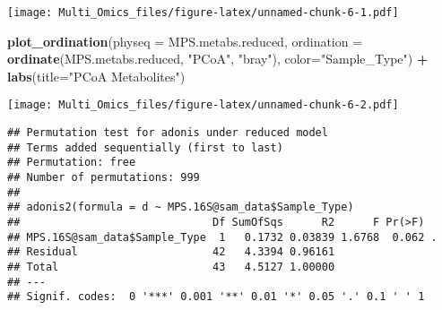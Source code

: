 \documentclass[
]{article}
\newenvironment{Shaded}{\begin{snugshade}}{\end{snugshade}}
\newcommand{\AttributeTok}[1]{\textcolor[rgb]{0.13,0.29,0.53}{#1}}
\newcommand{\FloatTok}[1]{\textcolor[rgb]{0.00,0.00,0.81}{#1}}
\newcommand{\FunctionTok}[1]{\textcolor[rgb]{0.13,0.29,0.53}{\textbf{#1}}}
\newcommand{\NormalTok}[1]{#1}
\newcommand{\OtherTok}[1]{\textcolor[rgb]{0.56,0.35,0.01}{#1}}
\newcommand{\SpecialCharTok}[1]{\textcolor[rgb]{0.81,0.36,0.00}{\textbf{#1}}}
\newcommand{\StringTok}[1]{\textcolor[rgb]{0.31,0.60,0.02}{#1}}
\begin{document}
\texttt{[image: Multi\_Omics\_files/figure-latex/unnamed-chunk-6-1.pdf]}

\begin{Shaded}
\begin{Highlighting}[]
\FunctionTok{plot\_ordination}\NormalTok{(}\AttributeTok{physeq =}\NormalTok{ MPS.metabs.reduced, }\AttributeTok{ordination =} \FunctionTok{ordinate}\NormalTok{(MPS.metabs.reduced, }\StringTok{"PCoA"}\NormalTok{, }\StringTok{"bray"}\NormalTok{), }\AttributeTok{color=}\StringTok{"Sample\_Type"}\NormalTok{) }\SpecialCharTok{+} 
  \FunctionTok{labs}\NormalTok{(}\AttributeTok{title=}\StringTok{"PCoA Metabolites"}\NormalTok{)}
\end{Highlighting}
\end{Shaded}

\texttt{[image: Multi\_Omics\_files/figure-latex/unnamed-chunk-6-2.pdf]}

\begin{Shaded}
\end{Shaded}

\begin{verbatim}
## Permutation test for adonis under reduced model
## Terms added sequentially (first to last)
## Permutation: free
## Number of permutations: 999
## 
## adonis2(formula = d ~ MPS.16S@sam_data$Sample_Type)
##                              Df SumOfSqs      R2      F Pr(>F)  
## MPS.16S@sam_data$Sample_Type  1   0.1732 0.03839 1.6768  0.062 .
## Residual                     42   4.3394 0.96161                
## Total                        43   4.5127 1.00000                
## ---
## Signif. codes:  0 '***' 0.001 '**' 0.01 '*' 0.05 '.' 0.1 ' ' 1
\end{verbatim}

\begin{Shaded}
\end{Shaded}
\end{document}
